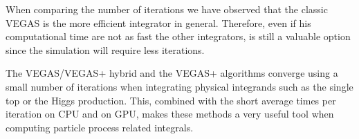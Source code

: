 \documentclass[../main/main.tex]{subfiles}
\begin{document}
When comparing the number of iterations we have observed that the classic VEGAS is the more efficient integrator in general. Therefore, even if his computational time are not as fast the other integrators, is still a valuable option since the simulation will require less iterations. 

The VEGAS/VEGAS+ hybrid and the VEGAS+ algorithms converge using a small number of iterations when integrating physical integrands such as the single top or the Higgs production. This, combined with the short average times per iteration on CPU and on GPU, makes these methods a very useful tool when computing particle process related integrals.



	
\end{document}
